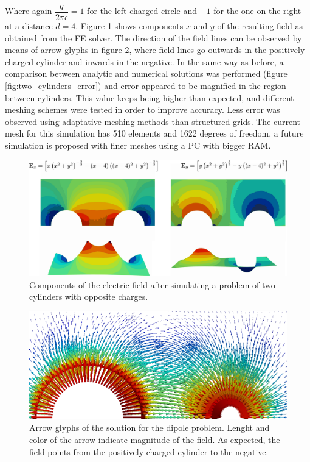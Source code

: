 Where again $\dfrac{q}{2\pi \epsilon} = 1$ for the left charged circle and $-1$ for the one on the right at a distance $d=4$. Figure \ref{fig:two_cylinders} shows components $x$ and $y$ of the resulting field as obtained from the FE solver. The direction of the field lines can be observed by means of arrow glyphs in figure \ref{fig:two_cylinders_glyph}, where field lines go outwards in the positively charged cylinder and inwards in the negative.
In the same way as before, a comparison between analytic and numerical solutions was performed (figure \ref{fig:two_cylinders_error}) and error appeared to be magnified in the region between cylinders. This value keeps being higher than expected, and different meshing schemes were tested in order to improve accuracy. Less error was observed using adaptative meshing methods than structured grids. The current mesh for this simulation has 510 elements and 1622 degrees of freedom, a future simulation is proposed with finer meshes using a PC with bigger RAM.

\begin{figure}
\centering
\includegraphics[scale=0.2]{./img/two_cylinders.pdf}
\caption{Components of the electric field after simulating a problem of two cylinders with opposite charges.}
\label{fig:two_cylinders}
\end{figure}

\begin{figure}
\centering
\includegraphics[scale=0.5]{./img/two_cylinders_Gliphs}
\caption{Arrow glyphs of the solution for the dipole problem. Lenght and color of the arrow indicate magnitude of the field. As expected, the field points from the positively charged cylinder to the negative.}
\label{fig:two_cylinders_glyph}
\end{figure}

